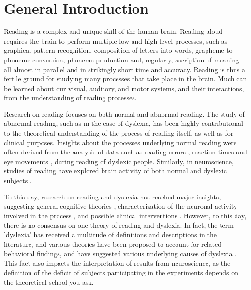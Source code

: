 \chapter*{General Introduction}

Reading is a complex and unique skill of the human brain. Reading aloud requires the brain to perform multiple low and high level processes, such as graphical pattern recognition, composition of letters into words, grapheme-to-phoneme conversion, phoneme production and, regularly, ascription of meaning – all almost in parallel and in strikingly short time and accuracy. Reading is thus a fertile ground for studying many processes that take place in the brain. Much can be learned about our visual, auditory, and motor systems, and their interactions, from the understanding of reading processes.

Research on reading focuses on both normal and abnormal reading. The study of abnormal reading, such as in the case of dyslexia, has been highly contributional to the theoretical understanding of the process of reading itself, as well as for clinical purposes. Insights about the processes underlying normal reading were often derived from the analysis of data such as reading errors \citep{mn73, ck12}, reaction times \citep{s98, s00} and eye movements \citep{jainta2011dyslexic}, during reading of dyslexic people. Similarly, in neuroscience, studies of reading have explored brain activity of both normal and dyslexic subjects \citep{gaab2007neural, shaywitz2002disruption, price2012review}.

To this day, research on reading and dyslexia has reached major insights, suggesting general cognitive theories \cite{stanovich1988explaining, vellutino1995semantic, ramus2003relationship, amitay2003reply, ck12}, characterization of the neuronal activity involved in the process \citep{joubert2004neural, gaab2007neural, dehaene2010children}, and possible clinical interventions \citep{coltheart1989treatment, aylward2003instructional, kipp2008remediation}. However, to this day, there is no consensus on one theory of reading and dyslexia. In fact, the term 'dyslexia' has received a multitude of definitions and descriptions in the literature, and various theories have been proposed to account for related behavioral findings, and have suggested various underlying causes of dyslexia \citep{eg14}. This fact also impacts the interpretation of results from neuroscience, as the definition of the deficit of subjects participating in the experiments depends on the theoretical school you ask. 

